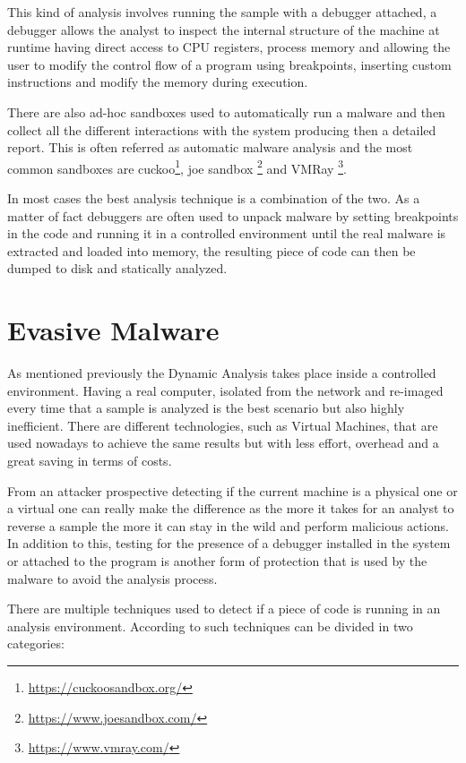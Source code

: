 This kind of analysis involves running the sample with a debugger attached, a debugger allows the analyst to inspect the internal structure of the machine at runtime having direct access to CPU registers, process memory and allowing the user to modify the control flow of a program using breakpoints, inserting custom instructions and modify the memory during execution. 

There are also ad-hoc sandboxes used to automatically run a malware and then collect all the different interactions with the system producing then a detailed report. This is often referred as automatic malware analysis and the most common sandboxes are cuckoo\footnote{\url{https://cuckoosandbox.org/}}, joe sandbox \footnote{\url{https://www.joesandbox.com/}} and VMRay \footnote{\url{https://www.vmray.com/}}. 

In most cases the best analysis technique is a combination of the two. As a matter of fact debuggers are often used to unpack malware by setting breakpoints in the code and running it in a controlled environment until the real malware is extracted and loaded into memory, the resulting piece of code can then be dumped to disk and statically analyzed. 

\section{Evasive Malware}
\label{sec:evmal}

As mentioned previously the Dynamic Analysis takes place inside a controlled environment. Having a real computer, isolated from the network and re-imaged every time that a sample is analyzed is the best scenario but also highly inefficient. There are different technologies, such as Virtual Machines, that are used nowadays to achieve the same results but with less effort, overhead and a great saving in terms of costs. 

From an attacker prospective detecting if the current machine is a physical one or a virtual one can really make the difference as the more it takes for an analyst to reverse a sample the more it can stay in the wild and perform malicious actions. In addition to this, testing for the presence of a debugger installed in the system or attached to the program is another form of protection that is used by the malware to avoid the analysis process.

There are multiple techniques used to detect if a piece of code is running in an analysis environment. According to \cite{9018111} such techniques can be divided in two categories:

